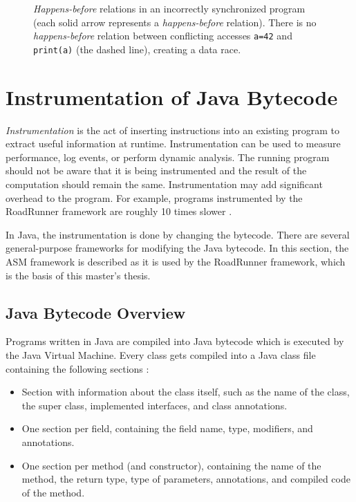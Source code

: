 \begin{figure}[hbt]
    \label{hb2}
    
    \caption{\emph{Happens-before} relations in an incorrectly synchronized
    program (each solid arrow represents a \emph{happens-before} relation).
    There is no \emph{happens-before} relation between conflicting accesses
    \texttt{a=42} and \texttt{print(a)} (the dashed line), creating a data
    race.}
\end{figure}


\section{Instrumentation of Java Bytecode}

\emph{Instrumentation} is the act of inserting instructions into an existing
program to extract useful information at runtime. Instrumentation can be used to
measure performance, log events, or perform dynamic analysis. The running
program should not be aware that it is being instrumented and the result of the
computation should remain the same. Instrumentation may add significant overhead
to the program. For example, programs instrumented by the RoadRunner framework
are roughly 10 times slower \cite{RoadRunner}.

In Java, the instrumentation is done by changing the bytecode. There are several
general-purpose frameworks for modifying the Java bytecode. In this section, the
ASM framework is described as it is used by the RoadRunner framework, which is
the basis of this master's thesis.

\subsection{Java Bytecode Overview}

Programs written in Java are compiled into Java bytecode which is executed by
the Java Virtual Machine. Every class gets compiled into a Java class file
containing the following sections \cite{asmguide}:
\begin{itemize}
    \item Section with information about the class itself, such as the name of
    the class, the super class, implemented interfaces, and class annotations.
    \item One section per field, containing the field name, type, modifiers, and
    annotations.
    \item One section per method (and constructor), containing the name of the
    method, the return type, type of parameters, annotations, and compiled code
    of the method.
\end{itemize}


